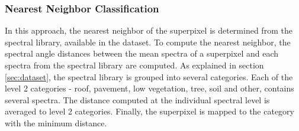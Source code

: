 \documentclass[12pt,twoside]{article}
\theoremstyle{plain}
\theoremstyle{definition}
\theoremstyle{remark}
\begin{document}
\subsubsection{Nearest Neighbor Classification} In this approach, the  nearest neighbor of the superpixel is determined from the spectral library, available in the dataset. To compute the nearest neighbor, the spectral angle distances between the mean spectra of a superpixel and each spectra from the spectral library are computed. As explained in section \ref{sec:dataset}, the spectral library is grouped into several categories. Each of the level 2 categories - roof, pavement, low vegetation, tree, soil and other, contains several spectra. The distance computed at the individual spectral level is averaged to level 2 categories. Finally, the superpixel is mapped to the category with the minimum distance.
\end{document}
